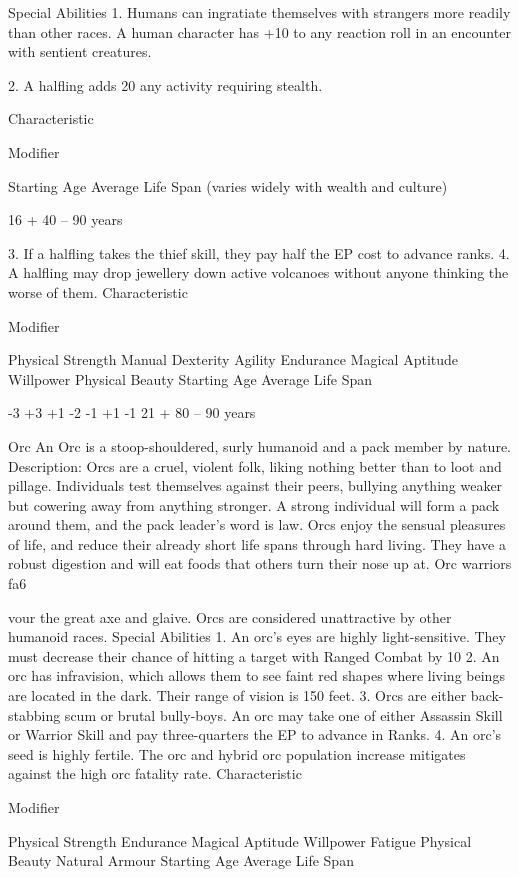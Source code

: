 \documentclass[a4paper]{article}
\begin{document}
\begin{multicols}{3}
Special Abilities
1. Humans can ingratiate themselves with strangers
more readily than other races. A human character
has +10 to any reaction roll in an encounter with
sentient creatures.

2. A halfling adds 20%
any activity requiring stealth.

Characteristic

Modifier

Starting Age
Average Life Span (varies
widely with wealth and culture)

16 +
40 – 90 years

3. If a halfling takes the thief skill, they pay half
the EP cost to advance ranks.
4. A halfling may drop jewellery down active
volcanoes without anyone thinking the worse of
them.
Characteristic

Modifier

Physical Strength
Manual Dexterity
Agility
Endurance
Magical Aptitude
Willpower
Physical Beauty
Starting Age
Average Life Span

-3
+3
+1
-2
-1
+1
-1
21 +
80 – 90 years

Orc
An Orc is a stoop-shouldered, surly humanoid
and a pack member by nature.
Description: Orcs are a cruel, violent folk, liking
nothing better than to loot and pillage. Individuals
test themselves against their peers, bullying anything weaker but cowering away from anything
stronger. A strong individual will form a pack
around them, and the pack leader’s word is law.
Orcs enjoy the sensual pleasures of life, and reduce
their already short life spans through hard living.
They have a robust digestion and will eat foods
that others turn their nose up at. Orc warriors fa6

vour the great axe and glaive. Orcs are considered
unattractive by other humanoid races.
Special Abilities
1. An orc’s eyes are highly light-sensitive. They
must decrease their chance of hitting a target with
Ranged Combat by 10%
2. An orc has infravision, which allows them to see
faint red shapes where living beings are located in
the dark. Their range of vision is 150 feet.
3. Orcs are either back-stabbing scum or brutal
bully-boys. An orc may take one of either Assassin
Skill or Warrior Skill and pay three-quarters the EP
to advance in Ranks.
4. An orc’s seed is highly fertile. The orc and hybrid orc population increase mitigates against the
high orc fatality rate.
Characteristic

Modifier

Physical Strength
Endurance
Magical Aptitude
Willpower
Fatigue
Physical Beauty
Natural Armour
Starting Age
Average Life Span


\end{multicols}
\end{document}
